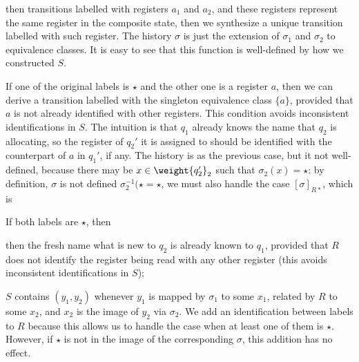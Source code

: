 
then 
transitions labelled with registers $a_1$ and $a_2$, and these registers represent the same register in the composite state, then we synthesize a unique transition labelled with such register. The history $\sigma$ is just the extension of $\sigma_1$ and $\sigma_2$ to equivalence classes. It is easy to see that this function is well-defined by how we constructed $S$.

If one of the original labels is $\star$ and the other one is a register $a$, then we can derive a transition labelled with the singleton equivalence class $\{a\}$, provided that $a$ is not already identified with other registers. This condition avoids inconsistent identifications in $S$. The intuition is that $q_1$ already knows the name that $q_2$ is allocating, so the register of $q_2'$ it is assigned to should be identified with the counterpart of $a$ in $q_1'$, if any. The history is as the previous case, but it not well-defined, because 
 there may be $x \in \weight{q_2'}_2$ such that $\sigma_2(x) = \star$: by definition, $\sigma$ is not defined
 $\sigma_2^{-1}(\star = \star$, 
 we must also handle the case $[\sigma]_{R*}$, which is 

If both labels are $\star$, then 

then the fresh name 
what is new to $q_2$ is already known to $q_1$, provided that $R$ does not identify the register being read with any other register (this avoids inconsistent identifications in $S$);

$S$ contains $(y_1,y_2)$ whenever $y_1$ is mapped by $\sigma_1$ to some $x_1$, related by $R$ to some $x_2$, and $x_2$ is the image of $y_2$ via $\sigma_2$. We add an identification between labels to $R$ because this allows us to handle the case when at least one of them is $\star$. However, if $\star$ is not in the image of the corresponding $\sigma$, this addition has no effect.




